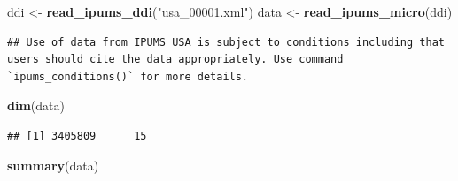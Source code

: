 \documentclass[
]{article}
\newenvironment{Shaded}{\begin{snugshade}}{\end{snugshade}}
\newcommand{\FunctionTok}[1]{\textcolor[rgb]{0.13,0.29,0.53}{\textbf{#1}}}
\newcommand{\NormalTok}[1]{#1}
\newcommand{\OtherTok}[1]{\textcolor[rgb]{0.56,0.35,0.01}{#1}}
\newcommand{\StringTok}[1]{\textcolor[rgb]{0.31,0.60,0.02}{#1}}
\begin{document}
\begin{Shaded}
\begin{Highlighting}[]
\NormalTok{ddi }\OtherTok{\textless{}{-}} \FunctionTok{read\_ipums\_ddi}\NormalTok{(}\StringTok{"usa\_00001.xml"}\NormalTok{)}
\NormalTok{data }\OtherTok{\textless{}{-}} \FunctionTok{read\_ipums\_micro}\NormalTok{(ddi)}
\end{Highlighting}
\end{Shaded}

\begin{verbatim}
## Use of data from IPUMS USA is subject to conditions including that users should cite the data appropriately. Use command `ipums_conditions()` for more details.
\end{verbatim}

\begin{Shaded}
\begin{Highlighting}[]
\FunctionTok{dim}\NormalTok{(data)}
\end{Highlighting}
\end{Shaded}

\begin{verbatim}
## [1] 3405809      15
\end{verbatim}

\begin{Shaded}
\begin{Highlighting}[]
\FunctionTok{summary}\NormalTok{(data)}
\end{Highlighting}
\end{Shaded}
\end{document}
